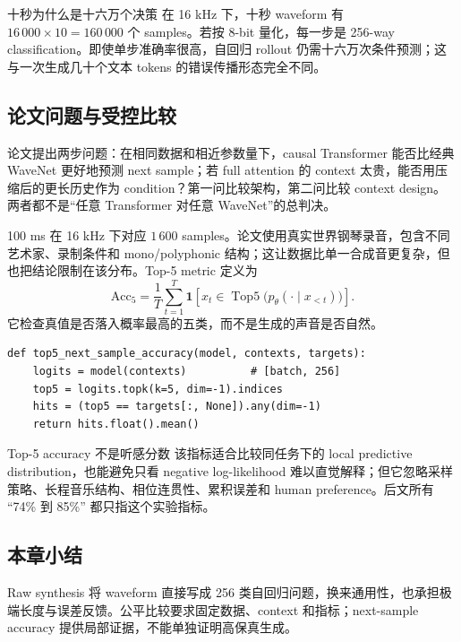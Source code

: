 \begin{importantbox}{十秒为什么是十六万个决策}
在 16 kHz 下，十秒 waveform 有 $16\,000\times10=160\,000$ 个 samples。若按 8-bit 量化，每一步是 256-way classification。即使单步准确率很高，自回归 rollout 仍需十六万次条件预测；这与一次生成几十个文本 tokens 的错误传播形态完全不同。
\end{importantbox}


\subsection{论文问题与受控比较}

论文提出两步问题：在相同数据和相近参数量下，causal Transformer 能否比经典 WaveNet 更好地预测 next sample；若 full attention 的 context 太贵，能否用压缩后的更长历史作为 condition？第一问比较架构，第二问比较 context design。两者都不是“任意 Transformer 对任意 WaveNet”的总判决。



100 ms 在 16 kHz 下对应 $1\,600$ samples。论文使用真实世界钢琴录音，包含不同艺术家、录制条件和 mono/polyphonic 结构；这让数据比单一合成音更复杂，但也把结论限制在该分布。Top-5 metric 定义为
\[
\mathrm{Acc}_{5}
=\frac{1}{T}\sum_{t=1}^{T}
\mathbf{1}\!\left[x_t\in\operatorname{Top5}\bigl(p_\theta(\cdot\mid x_{<t})\bigr)\right].
\]
它检查真值是否落入概率最高的五类，而不是生成的声音是否自然。

\begin{lstlisting}[caption={计算量化 waveform 的 next-sample top-5 accuracy。}]
def top5_next_sample_accuracy(model, contexts, targets):
    logits = model(contexts)          # [batch, 256]
    top5 = logits.topk(k=5, dim=-1).indices
    hits = (top5 == targets[:, None]).any(dim=-1)
    return hits.float().mean()
\end{lstlisting}

\begin{warningbox}{Top-5 accuracy 不是听感分数}
该指标适合比较同任务下的 local predictive distribution，也能避免只看 negative log-likelihood 难以直觉解释；但它忽略采样策略、长程音乐结构、相位连贯性、累积误差和 human preference。后文所有 “74\% 到 85\%” 都只指这个实验指标。
\end{warningbox}

\subsection{本章小结}

Raw synthesis 将 waveform 直接写成 256 类自回归问题，换来通用性，也承担极端长度与误差反馈。公平比较要求固定数据、context 和指标；next-sample accuracy 提供局部证据，不能单独证明高保真生成。

